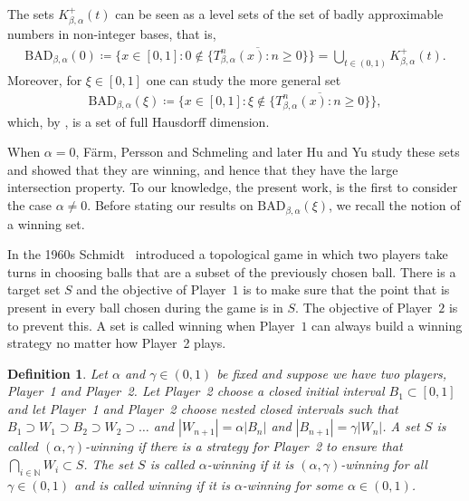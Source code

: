 \documentclass[a4paper,reqno,10pt]{amsart}
\newtheorem{definition}[theorem]{Definition}
\begin{document}
The sets $K^{+}_{\beta,\alpha}(t)$ can be seen as a level sets of the set of badly approximable numbers in non-integer bases, that is,
    \begin{align*}
        \mathrm{BAD}_{\beta, \alpha}(0) \coloneqq \{ x \in [0,1] \colon 0 \not\in \overline{\{T_{\beta, \alpha}^n(x) \colon n\geq 0\}}\} = \bigcup_{t \in (0, 1)} K^{+}_{\beta, \alpha}(t).
    \end{align*}
Moreover, for $\xi \in [0,1]$ one can study the more general set
    \begin{align*}
        \mathrm{BAD}_{\beta, \alpha}(\xi) \coloneqq \{ x \in [0,1] \colon \xi \not\in \overline{\{T_{\beta, \alpha}^n(x) \colon n\geq 0\}}\},
    \end{align*}
which, by , is a set of full Hausdorff dimension.
    
When $\alpha = 0$, F\"arm, Persson and Schmeling \cite{DavidFarm2010} and later Hu and Yu \cite{HY} study these sets and showed that they are winning, and hence that they have the large intersection property.  To our knowledge, the present work, is the first to consider the case $\alpha \neq 0$.  Before stating our results on $\mathrm{BAD}_{\beta, \alpha}(\xi)$, we recall the notion of a winning set.

In the 1960s Schmidt~\cite{S} introduced a topological game in which two players take turns in choosing balls that are a subset of the previously chosen ball. There is a target set $S$ and the objective of Player~$1$ is to make sure that the point that is present in every ball chosen during the game is in $S$. The objective of Player~$2$ is to prevent this. A set is called winning when Player~$1$ can always build a winning strategy no matter how Player~2 plays.

    \begin{definition}
        Let $\alpha$ and $\gamma\in (0,1)$ be fixed and suppose we have two players, Player~1 and Player~2.  Let Player~2 choose a closed initial interval $B_1\subset [0,1]$ and let Player~1 and Player~2 choose nested closed intervals such that $B_1 \supset W_1 \supset B_2 \supset W_2 \supset \ldots$ and $|W_{n+1}|=\alpha |B_n|$ and  $|B_{n+1}|=\gamma |W_n|$. A set $S$ is called $(\alpha,\gamma)$-winning if there is a strategy for Player~2 to ensure that $\bigcap_{i\in \mathbb{N}} W_i \subset S$. The set $S$ is called $\alpha$-winning if it is $(\alpha,\gamma)$-winning for all $\gamma\in (0,1)$ and is called winning if it is $\alpha$-winning for some $\alpha\in (0,1)$.
    \end{definition}
\end{document}
